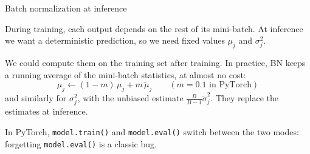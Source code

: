 \documentclass[11pt,aspectratio=169]{beamer}
\begin{document}
\begin{frame}{Batch normalization at inference}
    \setlength{\parskip}{3pt}

    During training, each output depends on the rest of its mini-batch. At
    inference we want a deterministic prediction, so
    we need fixed values $\mu_j$ and $\sigma_j^2$.

    We could compute them on the training set after training. In practice, BN
    keeps a running average of the mini-batch statistics, at almost no cost:
    \[
        \mu_j \leftarrow (1-m)\,\mu_j + m\,\widetilde{\mu}_j \qquad (m = 0.1 \text{ in PyTorch})
    \]
    and similarly for $\sigma_j^2$, with the unbiased estimate
    $\frac{B}{B-1}\widetilde{\sigma}_j^2$. They replace the estimates at inference.

    \vspace{0.5em}
    \begin{tcolorbox}[nndsorange]
        In PyTorch, \texttt{model.train()} and \texttt{model.eval()} switch
        between the two modes: forgetting \texttt{model.eval()} is a classic bug.
    \end{tcolorbox}


\end{frame}
\end{document}
